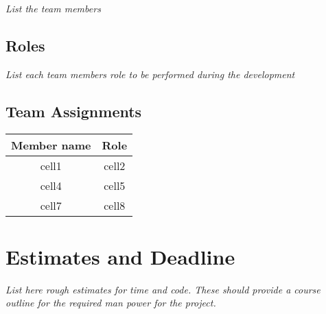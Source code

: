 \documentclass{article}
\begin{document}
\textit{List the team members}

\subsection{Roles}

\textit{List each team members role to be performed during the development}
   
\subsection{Team Assignments}

\begin{center}
    \begin{tabular}
        { |c|c| }
        \hline
        Member name & Role \\
        \hline
        cell1 & cell2 \\
        cell4 & cell5 \\
        cell7 & cell8 \\
        \hline
    \end{tabular}
\end{center}

\section{Estimates and Deadline}

\textit{List here rough estimates for time and code. These should provide a course
outline for the required man power for the project.}
\end{document}
